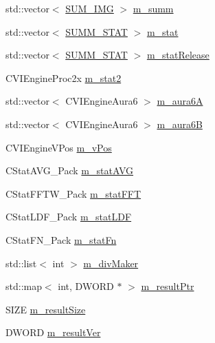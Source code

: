 \begin{DoxyCompactItemize}
std\+::vector$<$ \hyperlink{class_s_u_m___i_m_g}{S\+U\+M\+\_\+\+I\+M\+G} $>$ \hyperlink{class_c_v_i_engine_base_a29b792994f8c587ebdd4296031032f68}{m\+\_\+summ}
\item 
std\+::vector$<$ \hyperlink{class_s_u_m_m___s_t_a_t}{S\+U\+M\+M\+\_\+\+S\+T\+A\+T} $>$ \hyperlink{class_c_v_i_engine_base_a73ff2aaa9eeb589ce6ea73ef5dd62fda}{m\+\_\+stat}
\item 
std\+::vector$<$ \hyperlink{class_s_u_m_m___s_t_a_t}{S\+U\+M\+M\+\_\+\+S\+T\+A\+T} $>$ \hyperlink{class_c_v_i_engine_base_ab0a3c99fb49cddb42615132833b483d5}{m\+\_\+stat\+Release}
\item 
C\+V\+I\+Engine\+Proc2x \hyperlink{class_c_v_i_engine_base_a91282745c78c776f8922e20c4f3198f5}{m\+\_\+stat2}
\item 
std\+::vector$<$ C\+V\+I\+Engine\+Aura6 $>$ \hyperlink{class_c_v_i_engine_base_aa4b9c935b9223f0efcc05282e871254d}{m\+\_\+aura6\+A}
\item 
std\+::vector$<$ C\+V\+I\+Engine\+Aura6 $>$ \hyperlink{class_c_v_i_engine_base_a4415e8a105218982c6358907ae6f380e}{m\+\_\+aura6\+B}
\item 
C\+V\+I\+Engine\+V\+Pos \hyperlink{class_c_v_i_engine_base_afab397345881a9b8a44e6f8eae9805f0}{m\+\_\+v\+Pos}
\item 
C\+Stat\+A\+V\+G\+\_\+\+Pack \hyperlink{class_c_v_i_engine_base_aad8ff35fe2bc6a8d6da03b8f93ea3341}{m\+\_\+stat\+A\+V\+G}
\item 
C\+Stat\+F\+F\+T\+W\+\_\+\+Pack \hyperlink{class_c_v_i_engine_base_a475ef6e1419c21ec5d68097a4cd822ee}{m\+\_\+stat\+F\+F\+T}
\item 
C\+Stat\+L\+D\+F\+\_\+\+Pack \hyperlink{class_c_v_i_engine_base_abb0ef36905047eafd79bea2911824b7f}{m\+\_\+stat\+L\+D\+F}
\item 
C\+Stat\+F\+N\+\_\+\+Pack \hyperlink{class_c_v_i_engine_base_a8628211a0ca23ea36cf4059f3ab47f74}{m\+\_\+stat\+Fn}
\item 
std\+::list$<$ int $>$ \hyperlink{class_c_v_i_engine_base_a63cd16114d368eec7c2bce4c4ac8e9c8}{m\+\_\+div\+Maker}
\item 
std\+::map$<$ int, D\+W\+O\+R\+D $\ast$ $>$ \hyperlink{class_c_v_i_engine_base_a34c8596778c068f60030853df3589147}{m\+\_\+result\+Ptr}
\item 
S\+I\+Z\+E \hyperlink{class_c_v_i_engine_base_aec00e6d3113182f3193b3b4345c4e433}{m\+\_\+result\+Size}
\item 
D\+W\+O\+R\+D \hyperlink{class_c_v_i_engine_base_a756c886b931c2c905085558d219d4045}{m\+\_\+result\+Ver}
\item 

\end{DoxyCompactItemize}
